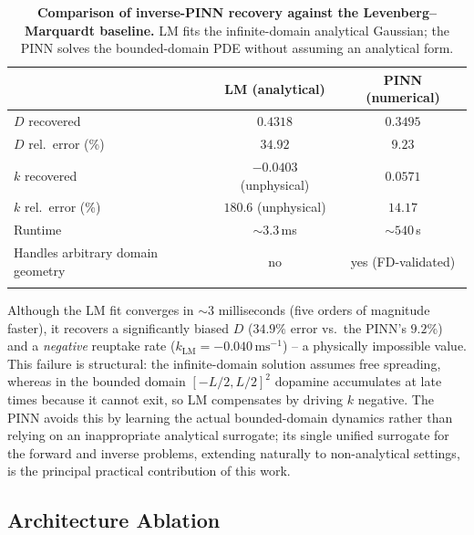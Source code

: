 \documentclass[pdflatex,sn-basic,Numbered]{sn-jnl}
\theoremstyle{thmstyleone}
\theoremstyle{thmstyletwo}
\begin{document}
\begin{table}[t]
\centering
\caption{\textbf{Comparison of inverse-PINN recovery against the
Levenberg--Marquardt baseline.} LM fits the infinite-domain
analytical Gaussian; the PINN solves the bounded-domain PDE
without assuming an analytical form.}
\label{tab:lm_baseline}
\begin{tabular}{lcc}
\toprule
                                   & \textbf{LM (analytical)} & \textbf{PINN (numerical)} \\
\midrule
$D$ recovered                      & $0.4318$                 & $0.3495$                  \\
$D$ rel.\ error (\%)               & $34.92$                  & $9.23$                    \\
$k$ recovered                      & $-0.0403$ (unphysical)   & $0.0571$                  \\
$k$ rel.\ error (\%)               & $180.6$ (unphysical)     & $14.17$                   \\
Runtime                            & $\sim 3.3$\,ms           & $\sim 540$\,s             \\
Handles arbitrary domain geometry  & no                       & yes (FD-validated)        \\
\botrule
\end{tabular}
\end{table}

Although the LM fit converges in $\sim 3$ milliseconds (five
orders of magnitude faster), it recovers a significantly biased
$D$ ($34.9\%$ error vs.\ the PINN's $9.2\%$) and a
\emph{negative} reuptake rate ($k_{\mathrm{LM}} =
-0.040\,\text{ms}^{-1}$) -- a physically impossible value. This
failure is structural: the infinite-domain solution assumes free
spreading, whereas in the bounded domain $[-L/2, L/2]^2$
dopamine accumulates at late times because it cannot exit, so LM
compensates by driving $k$ negative. The PINN avoids this by
learning the actual bounded-domain dynamics rather than relying
on an inappropriate analytical surrogate; its single unified
surrogate for the forward and inverse problems, extending
naturally to non-analytical settings, is the principal practical
contribution of this work.

\subsection{Architecture Ablation}
\label{sec:res_arch_ablation}
\end{document}
